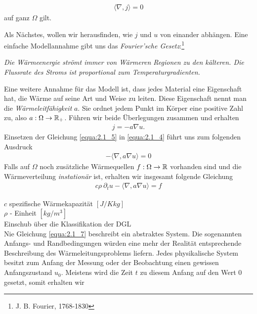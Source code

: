 \begin{eqnarray}
	\langle \nabla, j \rangle = 0
	\label{equa:2.1_4}
\end{eqnarray}
auf ganz $\Omega$ gilt.

Als Nächstes, wollen wir herausfinden, wie $j$ und $u$ von einander abhängen. Eine einfache Modellannahme gibt uns das \textit{Fourier'sche Gesetz}:\footnote{\label{foot:1.2.2} J. B. Fourier, 1768-1830} 

\begin{center}
	\begin{minipage}{0.8\textwidth}
		\textit{Die Wärmeenergie strömt immer von Wärmeren Regionen zu den kälteren. Die Flussrate des Stroms ist proportional zum Temperaturgradienten.}
	\end{minipage}
\end{center}

Eine weitere Annahme für das Modell ist, dass jedes Material eine Eigenschaft hat, die Wärme auf seine Art und Weise zu leiten. Diese Eigenschaft nennt man die \textit{Wärmeleitfähigkeit} $a$. Sie ordnet jedem Punkt im Körper eine positive Zahl zu, also $a: \Omega \rightarrow \mathbb{R}_+$. Führen wir beide Überlegungen zusammen und erhalten 
\begin{eqnarray}
	j = -a \nabla u.
	\label{equa:2.1_5}
\end{eqnarray}
Einsetzen der Gleichung \ref{equa:2.1_5} in \ref{equa:2.1_4} führt uns zum folgenden Ausdruck
\begin{eqnarray}
	-\langle \nabla, a \nabla u \rangle = 0
	\label{equa:2.1_6}
\end{eqnarray}
Falls auf $\Omega$ noch zusätzliche Wärmequellen $f:\Omega \rightarrow \mathbb{R}$ vorhanden sind und die Wärmeverteilung \textit{instationär} ist, erhalten wir insgesamt folgende Gleichung \cite[S.5]{Schweizer18}
\begin{eqnarray}
	c \rho \ \partial_t u - \langle \nabla, a\nabla u \rangle = f
	\label{equa:2.1_7}
\end{eqnarray}

$c$ spezifische Wärmekapazität $[J/Kkg]$ \\
$\rho$ - Einheit $[kg/m^3]$ \\


{\color{red} Einschub über die Klassifikation der DGL} \\

Nie Gleichung \ref{equa:2.1_7} beschreibt ein abstraktes System. Die sogenannten Anfangs- und Randbedingungen würden eine mehr der Realität entsprechende Beschreibung des Wärmeleitungsproblems liefern. Jedes physikalische System besitzt zum Anfang der Messung oder der Beobachtung einen gewissen Anfangszustand $u_0$. Meistens wird die Zeit $t$ zu diesem Anfang auf den Wert 0 gesetzt, somit erhalten wir

